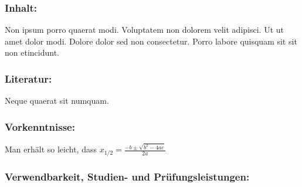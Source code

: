 \subsubsection*{\Large Inhalt:}
Non ipsum porro quaerat modi. Voluptatem non dolorem velit adipisci. Ut ut amet dolor modi. Dolore dolor sed non consectetur. Porro labore quisquam sit sit non etincidunt.
\subsubsection*{\Large Literatur:}
Neque quaerat sit numquam.
\subsubsection*{\Large Vorkenntnisse:}
Man erhält so leicht, dass $x_{1/2} = \frac{-b \pm \sqrt{b^2 - 4ac}}{2a}$
\subsubsection*{\Large Verwendbarkeit, Studien- und Prüfungsleistungen:}

